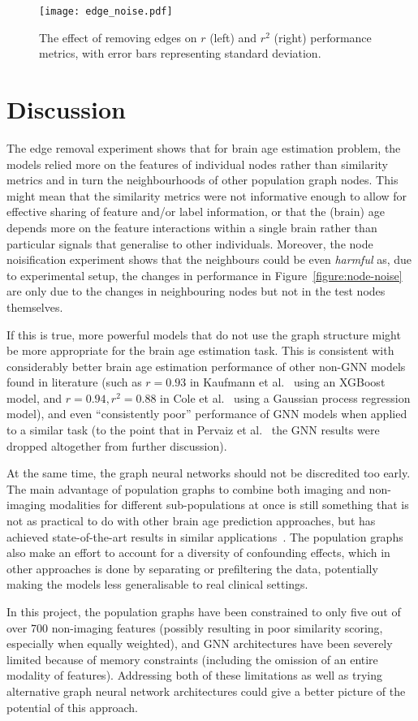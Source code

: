 \begin{figure}[h]
    \centering
    \texttt{[image: edge\_noise.pdf]}
    \caption{The effect of removing edges on $r$ (left) and $r^2$ (right) performance metrics, with error bars representing standard deviation.}\label{figure:edge-noise}
\end{figure}


\section{Discussion}
 The edge removal experiment shows that for brain age estimation problem, the models relied more on the features of individual nodes rather than similarity metrics and in turn the neighbourhoods of other population graph nodes. This might mean that the similarity metrics were not informative enough to allow for effective sharing of feature and/or label information, or that the (brain) age depends more on the feature interactions within a single brain rather than particular signals that generalise to other individuals. Moreover, the node noisification experiment shows that the neighbours could be even \textit{harmful} as, due to experimental setup, the changes in performance in Figure~\ref{figure:node-noise} are only due to the changes in neighbouring nodes but not in the test nodes themselves.

If this is true, more powerful models that do not use the graph structure might be more appropriate for the brain age estimation task. This is consistent with considerably better brain age estimation performance of other non-GNN models found in literature (such as $r=0.93$ in Kaufmann et al.~\cite{kaufmann2019} using an XGBoost model, and $r=0.94, r^2=0.88$ in Cole et al.~\cite{cole2018brain} using a Gaussian process regression model), and even ``consistently poor'' performance of GNN models when applied to a similar task (to the point that in Pervaiz et al.~\cite{pervaiz2020optimising} the GNN results were dropped altogether from further discussion).

At the same time, the graph neural networks should not be discredited too early. The main advantage of population graphs to combine both imaging and non-imaging modalities for different sub-populations at once is still something that is not as practical to do with other brain age prediction approaches, but has achieved state-of-the-art results in similar applications~\cite{parisot2018disease}. The population graphs also make an effort to account for a diversity of confounding effects, which in other approaches is done by separating or prefiltering the data, potentially making the models less generalisable to real clinical settings.

In this project, the population graphs have been constrained to only five out of over 700 non-imaging features (possibly resulting in poor similarity scoring, especially when equally weighted), and GNN architectures have been severely limited because of memory constraints (including the omission of an entire modality of features). Addressing both of these limitations as well as trying alternative graph neural network architectures could give a better picture of the potential of this approach.
